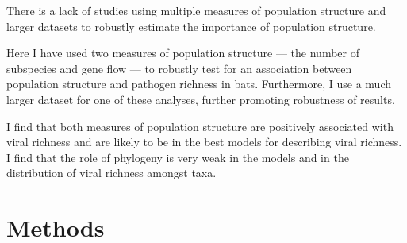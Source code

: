 
There is a lack of studies using multiple measures of population structure and larger datasets to robustly estimate the importance of population structure.



Here I have used two measures of population structure --- the number of subspecies and gene flow --- to robustly test for an association between population structure and pathogen richness in bats.
Furthermore, I use a much larger dataset for one of these analyses, further promoting robustness of results.



I find that both measures of population structure are positively associated with viral richness and are likely to be in the best models for describing viral richness.
I find that the role of phylogeny is very weak in the models and in the distribution of viral richness amongst taxa.



\section{Methods}



























































